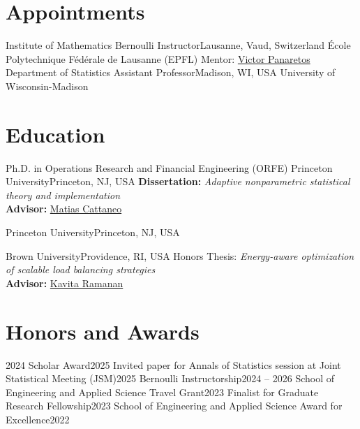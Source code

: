 \documentclass[10pt,a4paper,roman]{moderncv}        %
\begin{document}
\makecvtitle

\vspace{-1cm}
\section{Appointments}
{Institute of Mathematics}
{Bernoulli Instructor}{Lausanne, Vaud, Switzerland}
{École Polytechnique Fédérale de Lausanne (EPFL)}
{Mentor: \color{blue}\href{https://people.epfl.ch/victor.panaretos}{Victor Panaretos}}
{Department of Statistics}
{Assistant Professor}{Madison, WI, USA}
{University of Wisconsin-Madison}
{}
\vspace{-0.3cm}
\section{Education}
{Ph.D. in Operations Research and Financial Engineering (ORFE)}
{Princeton University}{Princeton, NJ, USA}{}
{\textbf{Dissertation:} \textit{Adaptive nonparametric statistical theory and implementation}
  \\
  \textbf{Advisor: }\color{blue}\href{https://cattaneo.princeton.edu}{Matias Cattaneo}\color{black}}

{Princeton University}{Princeton, NJ, USA}{}{}

{Brown University}{Providence, RI, USA}{}{ Honors Thesis: \textit{Energy-aware optimization of scalable load balancing
    strategies}
  \\
  \textbf{Advisor:}
  \color{blue}\href{https://www.brown.edu/academics/applied-mathematics/faculty/kavita-ramanan/home}
  {Kavita Ramanan}\color{black}}  %

\vspace{-0.3cm}
\section{Honors and Awards}
{2024 Scholar Award}{2025}
{}{}
{Invited paper for Annals of Statistics session at Joint Statistical Meeting (JSM)}{2025}
{}{}
{Bernoulli Instructorship}{2024 -- 2026}
{}{}
{School of Engineering and Applied Science Travel Grant}{2023}
{}{}
{Finalist for Graduate Research Fellowship}{2023}
{}{}
{School of Engineering and Applied Science Award for Excellence}{2022}
{}{}
\end{document}
